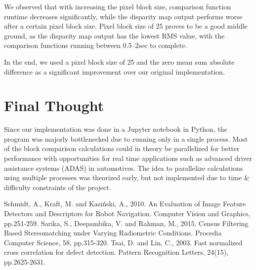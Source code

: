 \documentclass[conference]{IEEEtran}
\begin{document}
We observed that with increasing the pixel block size, comparison function runtime decreases significantly, while the disparity map output performs worse after a certain pixel block size. Pixel block size of 25 proves to be a good middle ground, as the disparity map output has the lowest RMS value, with the comparison functions running between 0.5--2sec to complete.

In the end, we used a pixel block size of 25 and the zero mean sum absolute difference as a significant improvement over our original implementation.

\section{Final Thought}

Since our implementation was done in a Jupyter notebook in Python, the program was majorly bottlenecked due to running only in a single process. Most of the block comparison calculations could in theory be parallelized for better performance with opportunities for real time applications such as advanced driver assistance systems (ADAS) in automotives. The idea to parallelize calculations using multiple processes was theorized early, but not implemented due to time \& difficulty constraints of the project.

\begin{thebibliography}{00}
 Schmidt, A., Kraft, M. and Kasiński, A., 2010. An Evaluation of Image Feature Detectors and Descriptors for Robot Navigation. Computer Vision and Graphics, pp.251-259.
 Sarika, S., Deepambika, V. and Rahman, M., 2015. Census Filtering Based Stereomatching under Varying Radiometric Conditions. Procedia Computer Science, 58, pp.315-320.
 Tsai, D. and Lin, C., 2003. Fast normalized cross correlation for defect detection. Pattern Recognition Letters, 24(15), pp.2625-2631.
\end{thebibliography}
\end{document}

